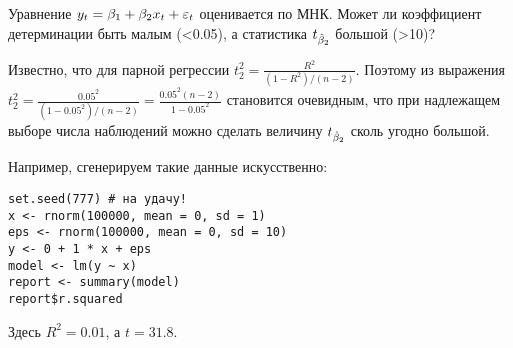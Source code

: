 \begin{problem}
Уравнение $y_t = \beta_1 + \beta_2 x_t + \varepsilon_t$ оценивается по МНК. Может ли коэффициент детерминации быть малым (<0.05), а статистика $t_{\hat{\beta}_2}$ большой (>10)?


\begin{sol}
Известно, что для парной регрессии $t_2^2 = \frac{R^2}{(1 - R^2)/(n-2)}$. Поэтому из выражения $t_2^2 = \frac{0.05^2}{(1 - 0.05^2)/(n-2)} = \frac{0.05^2 (n-2)}{1 - 0.05^2}$ становится очевидным, что при надлежащем выборе числа наблюдений можно сделать величину $t_{\hat{\beta}_2}$ сколь угодно большой.

Например, сгенерируем такие данные искусственно:

\begin{verbatim}
set.seed(777) # на удачу!
x <- rnorm(100000, mean = 0, sd = 1)
eps <- rnorm(100000, mean = 0, sd = 10)
y <- 0 + 1 * x + eps
model <- lm(y ~ x)
report <- summary(model)
report$r.squared
\end{verbatim}

Здесь $R^2=0.01$, а $t = 31.8$.


\end{sol}
\end{problem}



